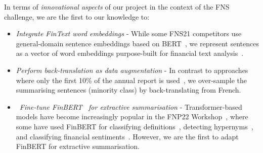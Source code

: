 In terms of \emph{innovational aspects} of our project in the context of the FNS challenge, we are the first to our knowledge to:
\begin{itemize}
    \item \emph{Integrate FinText word embeddings} - While some FNS21 competitors use general-domain sentence embeddings
    based on BERT~\cite{litvak-vanetik-2021-summarization, gokhan-etal-2021-extractive}, we represent sentences as
    a vector of word embeddings purpose-built for financial text analysis~\cite{rahimikia2021realised}.
    \item \emph{Perform back-translation as data augmentation} - In contrast to approaches where only the first 10\% of
    the annual report is used~\cite{orzhenovskii-2021-t5}, we over-sample the summarising sentences (minority class)
    by back-translating from French.
    \item~\emph{Fine-tune FinBERT~\cite{yang2020finbert} for extractive summarisation} - Transformer-based models have become increasingly
    popular in the FNP22 Workshop~\cite{khanna-etal-2022-transformer, pant-chopra-2022-multilingual},
    where some have used FinBERT for classifying definitions~\cite{ghosh-etal-2022-finrad},
    detecting hypernyms~\cite{peng-etal-2022-discovering}, and classifying financial sentiments~\cite{stepisnik-perdih-etal-2022-sentiment}.
    However, we are the first to adapt FinBERT for extractive summarisation.
\end{itemize}

